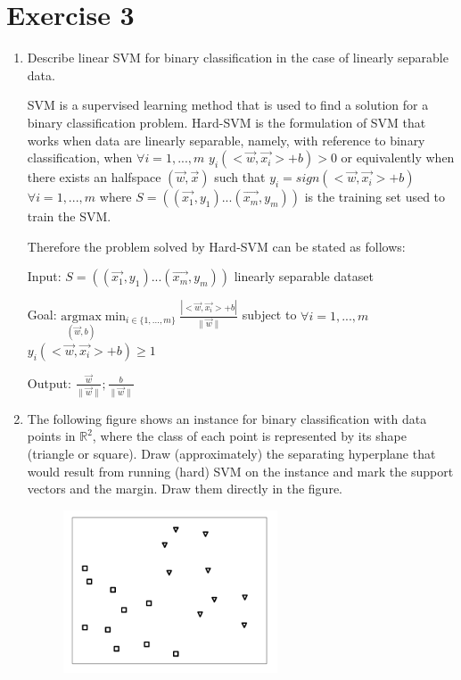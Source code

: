 \documentclass[a4paper,11pt,oneside]{book}
\begin{document}
\clearpage
\section{Exercise 3}
\begin{enumerate}
    \item Describe linear SVM for binary classification in the case of linearly separable data.
        \begin{solution}
            SVM is a supervised learning method that is used to find a solution for a binary classification problem. Hard-SVM is the formulation of SVM that works when data are linearly separable, namely, with reference to binary classification, when $\forall i = 1,...,m$ $y_i(<\vec{w},\vec{x_i}> + b) > 0$ or equivalently when there exists an halfspace $(\vec{w},\vec{x})$ such that $y_i = sign(<\vec{w},\vec{x_i}> + b)$ $\forall i = 1,...,m$ where $S = ((\vec{x_1},y_1)...(\vec{x_m},y_m))$ is the training set used to train the SVM.
            
            Therefore the problem solved by Hard-SVM can be stated as follows:
            
            Input: $S = ((\vec{x_1},y_1)...(\vec{x_m},y_m))$ linearly separable dataset
            
            Goal: $\underset{(\vec{w},b)}{\text{argmax}} \min_{i\in\{1,...,m\}} \frac{|<\vec{w},\vec{x_i}> + b|}{\|\vec{w}\|}$ subject to $\forall i = 1,...,m$ $y_i(<\vec{w},\vec{x_i}> + b) \geq 1$
            
            Output: $\frac{\vec{w}}{\|\vec{w}\|}; \frac{b}{\|\vec{w}\|}$
        \end{solution}
    \clearpage
    \item The following figure shows an instance for binary classification with data points in $\mathbb{R}^2$, where the class of each point is represented by its shape (triangle or square). Draw (approximately) the separating hyperplane that would result from running (hard) SVM on the instance and mark the support vectors and the margin. Draw them directly in the figure.
        \begin{figure}[H]
            \centering
            \includegraphics[width=0.6\textwidth,height=0.4\textheight,keepaspectratio]{images/3_12_Feb_2018.png}
        \end{figure}


\end{enumerate}
\end{document}
